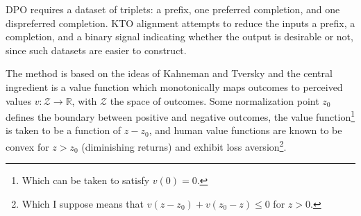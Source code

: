 \documentclass[11pt]{article}
\begin{document}
DPO requires a dataset of triplets: a prefix, one preferred completion, and one dispreferred
completion. KTO alignment \cite{ethayarajh2024ktomodelalignmentprospect} attempts to reduce the
inputs a prefix, a completion, and a binary signal indicating whether the output is desirable or
not, since such datasets are easier to construct.

The method is based on the ideas of Kahneman and Tversky and the central ingredient is a value
function which monotonically maps outcomes to perceived values $ v: \mathcal{Z}\longrightarrow
\mathbb{R}$, with $ \mathcal{Z} $ the space of outcomes. Some normalization point $ z _{ 0 } $
defines the boundary between positive and negative outcomes, the value function\footnote{Which can
be taken to satisfy $ v(0)=0 $.} is taken to be a function of $ z-z _{ 0 } $, and human value
functions are known to be convex for $ z > z _{ 0 }$ (diminishing returns) and exhibit loss
aversion\footnote{Which I suppose means that $v \left ( z-z_0 \right) + v \left ( z _{ 0 }-z \right)
\le 0 $ for $ z>0 $.}.
\end{document}
